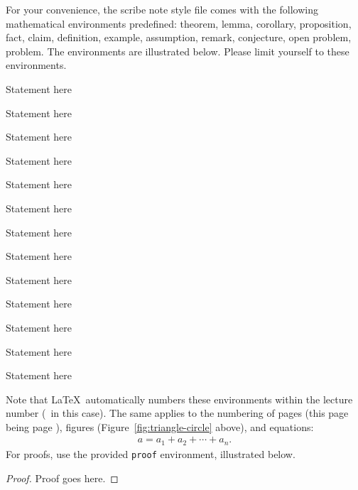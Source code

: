 \documentclass[usletter]{article}
\begin{document}
For your convenience, the scribe note style file comes
with the following mathematical environments
predefined: theorem, lemma, corollary, proposition,
fact, claim, definition, example, assumption, remark,
conjecture, open problem, problem. The environments are
illustrated below.  Please limit yourself to these
environments.

\begin{theorem}
Statement here
\end{theorem}

\begin{lemma}
Statement here
\end{lemma}

\begin{corollary}
Statement here
\end{corollary}

\begin{proposition}
Statement here
\end{proposition}

\begin{fact}
Statement here
\end{fact}

\begin{claim}
Statement here
\end{claim}

\begin{definition}
Statement here
\end{definition}

\begin{example}
Statement here
\end{example}

\begin{assumption}
Statement here
\end{assumption}

\begin{remark}
Statement here
\end{remark}

\begin{conjecture}
Statement here
\end{conjecture}

\begin{openproblem}
Statement here
\end{openproblem}

\begin{problem}
Statement here
\end{problem}


\noindent
Note that \LaTeX\ automatically numbers these
environments within the lecture number (\thelecture\ in
this case).  The same applies to the numbering of pages
(this page being page \thepage), figures
(Figure~\ref{fig:triangle-circle} above), and
equations:
\begin{align}
a = a_1+a_2+\cdots+a_n.
\end{align}
\noindent
For proofs, use the provided {\tt proof} environment,
illustrated below.

\begin{proof}
Proof goes here.
\end{proof}

\newpage



\end{document}
